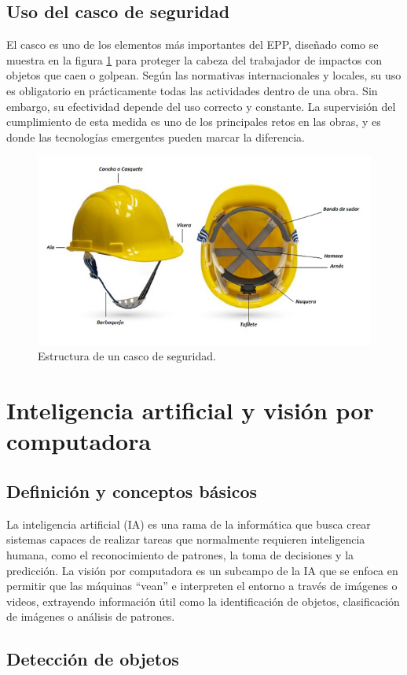 \subsection{Uso del casco de seguridad}

El casco es uno de los elementos más importantes del EPP, diseñado como se muestra en la figura \ref{fig:casco} para proteger la cabeza del trabajador de impactos con objetos que caen o golpean. Según las normativas internacionales y locales, su uso es obligatorio en prácticamente todas las actividades dentro de una obra. Sin embargo, su efectividad depende del uso correcto y constante. La supervisión del cumplimiento de esta medida es uno de los principales retos en las obras, y es donde las tecnologías emergentes pueden marcar la diferencia.

\begin{figure}[!ht]
  \centering
  \includegraphics[width=.49\linewidth]{images/casco.png}
  \caption{Estructura de un casco de seguridad.}
  \label{fig:casco}
\end{figure}

\section{Inteligencia artificial y visión por computadora}

\subsection{Definición y conceptos básicos}

La inteligencia artificial (IA) es una rama de la informática que busca crear sistemas capaces de realizar tareas que normalmente requieren inteligencia humana, como el reconocimiento de patrones, la toma de decisiones y la predicción. La visión por computadora es un subcampo de la IA que se enfoca en permitir que las máquinas “vean” e interpreten el entorno a través de imágenes o videos, extrayendo información útil como la identificación de objetos, clasificación de imágenes o análisis de patrones.

\subsection{Detección de objetos}

